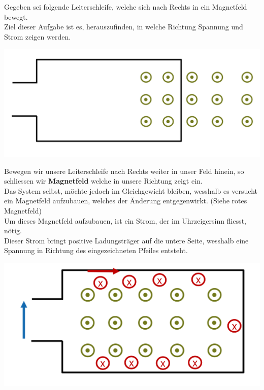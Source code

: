 \beginbsp
Gegeben sei folgende Leiterschleife, welche sich nach Rechts in ein Magnetfeld bewegt. \\
Ziel dieser Aufgabe ist es, herauszufinden, in welche Richtung Spannung und Strom zeigen werden.
\begin{center}
  \includegraphics[scale=0.2]{img/ex-lenzsche-regel}
\end{center}

Bewegen wir unsere Leiterschleife nach Rechts weiter in unser Feld hinein, so schliessen wir \textbf{Magnetfeld} welche in unsere Richtung zeigt ein. \\
Das System selbst, möchte jedoch im Gleichgewicht bleiben, wesshalb es versucht ein Magnetfeld aufzubauen, welches der Änderung entgegenwirkt. (Siehe rotes Magnetfeld) \\
Um dieses Magnetfeld aufzubauen, ist ein Strom, der im Uhrzeigersinn fliesst, nötig. \\
Dieser Strom bringt positive Ladungsträger auf die untere Seite, wesshalb eine Spannung in Richtung des eingezeichneten Pfeiles entsteht.


\begin{center}

  \includegraphics[scale=0.2]{img/ex-lenzsche-r-sol}
\end{center}
\iend

